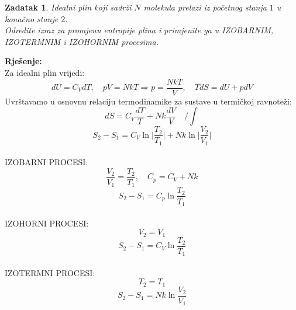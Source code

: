\documentclass[a4paper,12pt]{article}
\newtheorem{ZDK}{Zadatak}[section]
\begin{document}
\newpage
\begin{ZDK}
	Idealni plin koji sadr\v{z}i $N$ molekula prelazi iz po\v{c}etnog stanja $1$ u kona\v{c}no stanje $2$. \\
	Odredite izraz za promjenu entropije plina i primjenite ga u IZOBARNIM, IZOTERMNIM i IZOHORNIM procesima.
\end{ZDK}
\textbf{Rje\v{s}enje:} \\
\newline
Za idealni plin vrijedi:
$$ dU=C_VdT, \quad pV=NkT \Rightarrow p=\frac{NkT}{V}, \quad TdS=dU+pdV $$
Uvr\v{s}tavamo u osnovnu relaciju termodinamike za sustave u termi\v{c}koj ravnote\v{z}i:
$$ dS=C_V\frac{dT}{T}+Nk\frac{dV}{V} \quad \Big/ \int $$
$$ S_2-S_1=C_V \ln{ \Big| \frac{T_2}{T_1} \Big|} +Nk \ln{ \Big| \frac{V_2}{V_1} \Big|} $$
\\
IZOBARNI PROCESI:
\\
$$ \frac{V_2}{V_1}=\frac{T_2}{T_1}, \quad C_p=C_V+Nk $$
$$ S_2-S_1=C_p \ln{\frac{T_2}{T_1}} $$
\\
IZOHORNI PROCESI:
\\
$$ V_2=V_1 $$
$$ S_2-S_1=C_V \ln{\frac{T_2}{T_1}} $$
\\
IZOTERMNI PROCESI:
\\
$$ T_2=T_1 $$
$$ S_2-S_1=Nk \ln{\frac{V_2}{V_1}} $$
\end{document}
